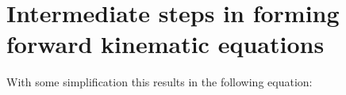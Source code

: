 \chapter{Intermediate steps in forming forward kinematic equations} \label{sec:FWKinEqSteps}



With some simplification this results in the following equation:

